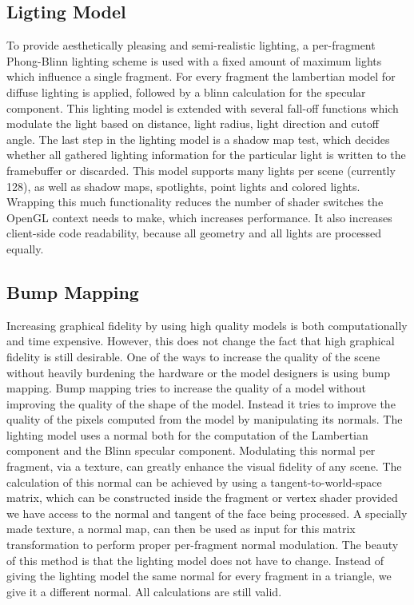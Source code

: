 \subsection{Ligting Model}
To provide aesthetically pleasing and semi-realistic lighting, a per-fragment Phong-Blinn lighting scheme is used with a fixed amount of maximum lights which influence a single fragment. For every fragment the lambertian model for diffuse lighting is applied, followed by a blinn calculation for the specular component. This lighting model is extended with several fall-off functions which modulate the light based on distance, light radius, light direction and cutoff angle. The last step in the lighting model is a shadow map test, which decides whether all gathered lighting information for the particular light is written to the framebuffer or discarded. This model supports many lights per scene (currently 128), as well as shadow maps, spotlights, point lights and colored lights. Wrapping this much functionality reduces the number of shader switches the OpenGL context needs to make, which increases performance. It also increases client-side code readability, because all geometry and all lights are processed 
equally.

\subsection{Bump Mapping}
Increasing graphical fidelity by using high quality models is both computationally and time expensive. However, this does not change the fact that high graphical fidelity is still desirable. One of the ways to increase the quality of the scene without heavily burdening the hardware or the model designers is using bump mapping. Bump mapping tries to increase the quality of a model without improving the quality of the shape of the model. Instead it tries to improve the quality of the pixels computed from the model by manipulating its normals.
The lighting model uses a normal both for the computation of the Lambertian component and the Blinn specular component. Modulating this normal per fragment, via a texture, can greatly enhance the visual fidelity of any scene. The calculation of this normal can be achieved by using a tangent-to-world-space matrix, which can be constructed inside the fragment or vertex shader provided we have access to the normal and tangent of the face being processed. A specially made texture, a normal map, can then be used as input for this matrix transformation to perform proper per-fragment normal modulation. The beauty of this method is that the lighting model does not have to change. Instead of giving the lighting model the same normal for every fragment in a triangle, we give it a different normal. All calculations are still valid.

